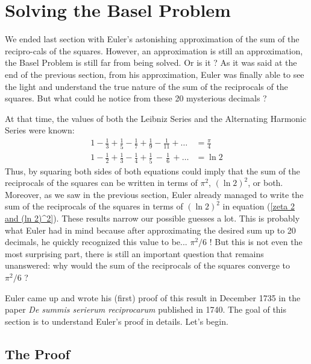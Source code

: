 \section{Solving the Basel Problem} \label{sec: Basel Problem}

We ended last section with Euler's astonishing approximation of the sum of the recipro-cals of the squares. However, an approximation is still an approximation, the Basel Problem is still far from being solved. Or is it ? As it was said at the end of the previous section, from his approximation, Euler was finally able to see the light and understand the true nature of the sum of the reciprocals of the squares. But what could he notice from these 20 mysterious decimals ?

At that time, the values of both the Leibniz Series and the Alternating Harmonic Series were known:
\begin{align}
    1 - \frac{1}{3} + \frac{1}{5} - \frac{1}{7} + \frac{1}{9} - \frac{1}{11} + \dots &= \frac{\pi}{4} \\
    1 - \frac{1}{2} + \frac{1}{3} - \frac{1}{4} + \frac{1}{5} \, - \, \frac{1}{6} \, + \dots &= \ln 2
\end{align}
Thus, by squaring both sides of both equations could imply that the sum of the reciprocals of the squares can be written in terms of $\pi^2$, $(\ln 2)^2$, or both. Moreover, as we saw in the previous section, Euler already managed to write the sum of the reciprocals of the squares in terms of $(\ln 2)^2$ in equation (\ref{zeta 2 and (ln 2)^2}). These results narrow our possible guesses a lot. This is probably what Euler had in mind because after approximating the desired sum up to 20 decimals, he quickly recognized this value to be... $\pi^2/6$ ! But this is not even the most surprising part, there is still an important question that remains unanswered: why would the sum of the reciprocals of the squares converge to $\pi^2/6$ ?

Euler came up and wrote his (first) proof of this result in December 1735 in the paper \textit{De summis serierum reciprocarum} \cite{eulerBaselProblem} published in 1740. The goal of this section is to understand Euler's proof in details. Let's begin.

\subsection*{The Proof}

